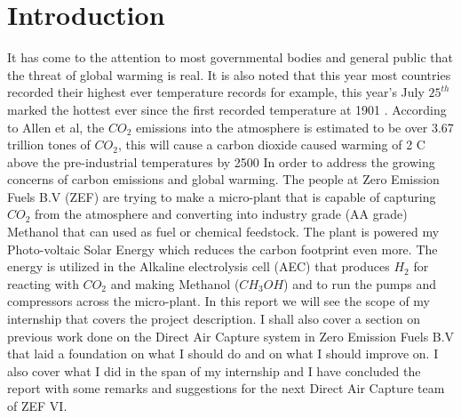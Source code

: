 \section{Introduction}
It has come to the attention to most governmental bodies and general public that the threat of global warming is real. It is also noted that this year most countries recorded their highest ever temperature records for example, this year's July $25^{th}$ marked the hottest ever since the first recorded temperature at 1901 \cite{Pieters2019}. According to Allen et al, the $CO_2$ emissions into the atmosphere is estimated to be over 3.67 trillion tones of $CO_2$, this will cause a carbon dioxide caused warming of 2 \degree C above the pre-industrial temperatures by 2500 \cite{Allen2009}
\bigbreak
\noindent
In order to address the growing concerns of carbon emissions and global warming. The people at Zero Emission Fuels B.V (ZEF) are trying to make a micro-plant that is capable of capturing $CO_2$ from the atmosphere and converting into industry grade (AA grade) Methanol that can used as fuel or chemical feedstock. The plant is powered my Photo-voltaic Solar Energy which reduces the carbon footprint even more. The energy is utilized in the Alkaline electrolysis cell (AEC) that produces $H_2$ for reacting with $CO_2$ and making Methanol ($CH_{3}OH$) and to run the pumps and compressors across the micro-plant. 
\bigbreak
\noindent 
In this report we will see the scope of my internship that covers the project description. I shall also cover a section on previous work done on the Direct Air Capture system in Zero Emission Fuels B.V that laid a foundation on what I should do and on what I should improve on. I also cover what I did in the span of my internship and I have concluded the report with some remarks and suggestions for the next Direct Air Capture team of ZEF VI.   